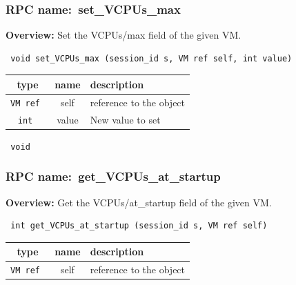 \subsubsection{RPC name:~set\_VCPUs\_max}

{\bf Overview:} 
Set the VCPUs/max field of the given VM.

\begin{verbatim} void set_VCPUs_max (session_id s, VM ref self, int value)\end{verbatim}



 
\vspace{0.3cm}
\begin{tabular}{|c|c|p{7cm}|}
 \hline
{\bf type} & {\bf name} & {\bf description} \\ \hline
{\tt VM ref } & self & reference to the object \\ \hline 

{\tt int } & value & New value to set \\ \hline 

\end{tabular}

\vspace{0.3cm}

{\tt 
void
}



\vspace{0.3cm}
\vspace{0.3cm}
\vspace{0.3cm}
\subsubsection{RPC name:~get\_VCPUs\_at\_startup}

{\bf Overview:} 
Get the VCPUs/at\_startup field of the given VM.

\begin{verbatim} int get_VCPUs_at_startup (session_id s, VM ref self)\end{verbatim}



 
\vspace{0.3cm}
\begin{tabular}{|c|c|p{7cm}|}
 \hline
{\bf type} & {\bf name} & {\bf description} \\ \hline
{\tt VM ref } & self & reference to the object \\ \hline 

\end{tabular}

